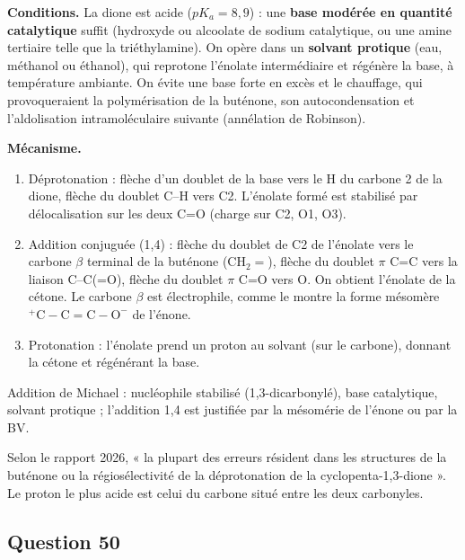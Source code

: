 \documentclass[11pt,a4paper]{article}
\providecommand{\tightlist}{\setlength{\itemsep}{0pt}\setlength{\parskip}{0pt}}
\begin{document}
\textbf{Conditions.} La dione est acide (\(pK_a=8{,}9\)) : une \textbf{base modérée en quantité catalytique} suffit (hydroxyde ou alcoolate de sodium catalytique, ou une amine tertiaire telle que la triéthylamine). On opère dans un \textbf{solvant protique} (eau, méthanol ou éthanol), qui reprotone l'énolate intermédiaire et régénère la base, à température ambiante. On évite une base forte en excès et le chauffage, qui provoqueraient la polymérisation de la buténone, son autocondensation et l'aldolisation intramoléculaire suivante (annélation de Robinson).

\textbf{Mécanisme.}

\begin{enumerate}
\def\labelenumi{\arabic{enumi}.}
\tightlist
\item
  Déprotonation : flèche d'un doublet de la base vers le H du carbone 2 de la dione, flèche du doublet C--H vers C2. L'énolate formé est stabilisé par délocalisation sur les deux C=O (charge sur C2, O1, O3).
\item
  Addition conjuguée (1,4) : flèche du doublet de C2 de l'énolate vers le carbone \(\beta\) terminal de la buténone (\(\mathrm{CH_2{=}}\)), flèche du doublet \(\pi\) C=C vers la liaison C--C(=O), flèche du doublet \(\pi\) C=O vers O. On obtient l'énolate de la cétone. Le carbone \(\beta\) est électrophile, comme le montre la forme mésomère \(\mathrm{{}^+C{-}C{=}C{-}O^-}\) de l'énone.
\item
  Protonation : l'énolate prend un proton au solvant (sur le carbone), donnant la cétone et régénérant la base.
\end{enumerate}

\begin{methode}

Addition de Michael : nucléophile stabilisé (1,3-dicarbonylé), base catalytique, solvant protique ; l'addition 1,4 est justifiée par la mésomérie de l'énone ou par la BV.

\end{methode}

\begin{piege}

Selon le rapport 2026, « la plupart des erreurs résident dans les structures de la buténone ou la régiosélectivité de la déprotonation de la cyclopenta-1,3-dione ». Le proton le plus acide est celui du carbone situé entre les deux carbonyles.

\end{piege}

\hypertarget{question-50}{%
\subsection{Question 50}\label{question-50}}
\end{document}
